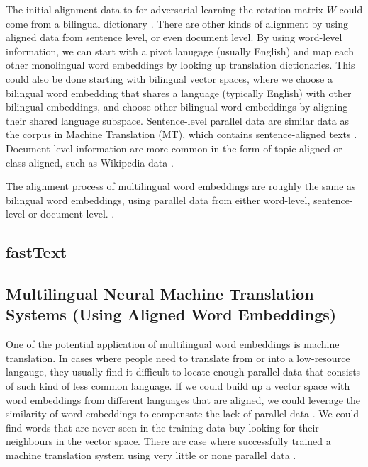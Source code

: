 \documentclass[thesis,fonts=libertine]{cluu}
\begin{document}
The initial alignment data to for adversarial learning the rotation matrix $W$ could come from a bilingual dictionary \parencite{Mikolov:2013ac}. There are other kinds of alignment by using aligned data from sentence level, or even document level. By using word-level information, we can start with a pivot lanugage (usually English) and map each other monolingual word embeddings by looking up translation dictionaries. This could also be done starting with bilingual vector spaces, where we choose a bilingual word embedding that shares a language (typically English) with other bilingual embeddings, and choose other bilingual word embeddings by aligning their shared language subspace. Sentence-level parallel data are similar data as the corpus in Machine Translation (MT), which contains sentence-aligned texts \parencite{Hermann:2013aa}. Document-level information are more common in the form of topic-aligned or class-aligned, such as Wikipedia data \parencite{vulic-moens-2013-study}.

The alignment process of multilingual word embeddings are roughly the same as bilingual word embeddings, using parallel data from either word-level, sentence-level or document-level. \parencite{Ruder:2019aa}.

\subsection{fastText}

\subsection{Multilingual Neural Machine Translation Systems (Using Aligned Word Embeddings)}

One of the potential application of multilingual word embeddings is machine translation. In cases where people need to translate from or into a low-resource langauge, they usually find it difficult to locate enough parallel data that consists of such kind of less common language. If we could build up a vector space with word embeddings from different languages that are aligned, we could leverage the similarity of word embeddings to compensate the lack of parallel data \parencite{zou-etal-2013-bilingual}. We could find words that are never seen in the training data buy looking for their neighbours in the vector space. There are case where successfully trained a machine translation system using very little or none parallel data \parencite{Conneau:2017aa}.
\end{document}
